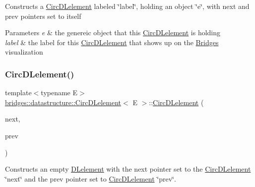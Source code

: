 Constructs a \mbox{\hyperlink{classbridges_1_1datastructure_1_1_circ_d_lelement}{Circ\+D\+Lelement}} labeled \char`\"{}label\char`\"{}, holding an object \char`\"{}e\char`\"{}, with next and prev pointers set to itself 
\begin{DoxyParams}{Parameters}
{\em e} & the genereic object that this \mbox{\hyperlink{classbridges_1_1datastructure_1_1_circ_d_lelement}{Circ\+D\+Lelement}} is holding \\
\hline
{\em label} & the label for this \mbox{\hyperlink{classbridges_1_1datastructure_1_1_circ_d_lelement}{Circ\+D\+Lelement}} that shows up on the \mbox{\hyperlink{classbridges_1_1_bridges}{Bridges}} visualization \\
\hline
\end{DoxyParams}
\mbox{\label{classbridges_1_1datastructure_1_1_circ_d_lelement_a8db4aa80feb388d5206d657d80385f16}} 
\subsubsection{\texorpdfstring{CircDLelement()}{CircDLelement()}\hspace{0.1cm}{\footnotesize\ttfamily [3/4]}}
{\footnotesize\ttfamily template$<$typename E$>$ \\
\mbox{\hyperlink{classbridges_1_1datastructure_1_1_circ_d_lelement}{bridges\+::datastructure\+::\+Circ\+D\+Lelement}}$<$ E $>$\+::\mbox{\hyperlink{classbridges_1_1datastructure_1_1_circ_d_lelement}{Circ\+D\+Lelement}} (\begin{DoxyParamCaption}\item[{\mbox{\hyperlink{classbridges_1_1datastructure_1_1_circ_d_lelement}{Circ\+D\+Lelement}}$<$ E $>$}]{next,  }\item[{\mbox{\hyperlink{classbridges_1_1datastructure_1_1_circ_d_lelement}{Circ\+D\+Lelement}}$<$ E $>$}]{prev }\end{DoxyParamCaption})\hspace{0.3cm}{\ttfamily [inline]}}

Constructs an empty \mbox{\hyperlink{classbridges_1_1datastructure_1_1_d_lelement}{D\+Lelement}} with the next pointer set to the \mbox{\hyperlink{classbridges_1_1datastructure_1_1_circ_d_lelement}{Circ\+D\+Lelement}} \char`\"{}next\char`\"{} and the prev pointer set to \mbox{\hyperlink{classbridges_1_1datastructure_1_1_circ_d_lelement}{Circ\+D\+Lelement}} \char`\"{}prev\char`\"{}.


